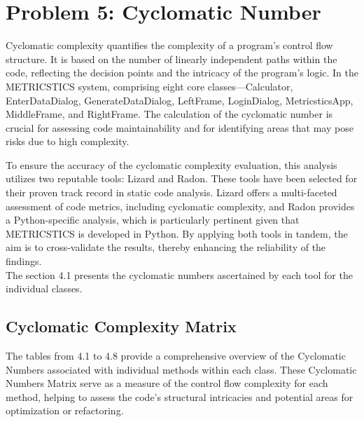 \documentclass[english,12pt,a4paper]{report}
\begin{document}
	\chapter{Problem 5: Cyclomatic Number}
	Cyclomatic complexity quantifies the complexity of a program's control flow structure. It is based on the number of linearly independent paths within the code, reflecting the decision points and the intricacy of the program's logic. In the METRICSTICS system, comprising eight core classes—Calculator, EnterDataDialog, GenerateDataDialog, LeftFrame, LoginDialog, MetricsticsApp, MiddleFrame, and RightFrame. The calculation of the cyclomatic number is crucial for assessing code maintainability and for identifying areas that may pose risks due to high complexity.
	
	To ensure the accuracy of the cyclomatic complexity evaluation, this analysis utilizes two reputable tools: Lizard and Radon. These tools have been selected for their proven track record in static code analysis. Lizard offers a multi-faceted assessment of code metrics, including cyclomatic complexity, and Radon provides a Python-specific analysis, which is particularly pertinent given that METRICSTICS is developed in Python. By applying both tools in tandem, the aim is to cross-validate the results, thereby enhancing the reliability of the findings.\\
	\vspace{8pt}
	The section 4.1 presents the cyclomatic numbers ascertained by each tool for the individual classes.
	\section{Cyclomatic Complexity Matrix}
	The tables from 4.1 to 4.8 provide a comprehensive overview of the Cyclomatic Numbers associated with individual methods within each class. These Cyclomatic Numbers Matrix serve as a measure of the control flow complexity for each method, helping to assess the code's structural intricacies and potential areas for optimization or refactoring.
			
\end{document}
